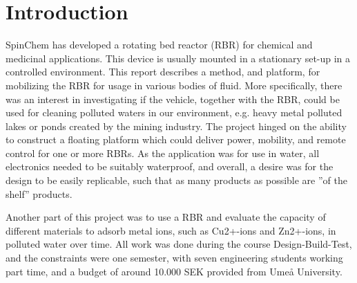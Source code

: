 \section{Introduction}

SpinChem has developed a rotating bed reactor (RBR) for chemical and medicinal applications. This device is usually mounted in a stationary set-up in a controlled environment. This report describes a method, and platform, for mobilizing the RBR for usage in various bodies of fluid. More specifically, there was an interest in investigating if the vehicle, together with the RBR, could be used for cleaning polluted waters in our environment, e.g. heavy metal polluted lakes or ponds created by the mining industry. The project hinged on the ability to construct a floating platform which could deliver power, mobility, and remote control for one or more RBRs. As the application was for use in water, all electronics needed to be suitably waterproof, and overall, a desire was for the design to be easily replicable, such that as many products as possible are ''of the shelf'' products. 

Another part of this project was to use a RBR and evaluate the capacity of different materials to adsorb metal ions, such as Cu2+-ions and Zn2+-ions, in polluted water over time. All work was done during the course Design-Build-Test, and the constraints were one semester, with seven engineering students working part time, and a budget of around 10.000 SEK provided from Umeå University.